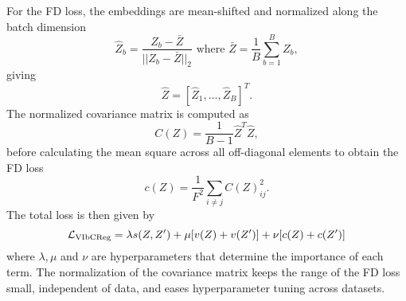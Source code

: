 \documentclass[../../thesis.tex]{subfiles}
\begin{document}
For the FD loss, the embeddings are mean-shifted and normalized along the batch dimension
\begin{equation}
    \widehat{Z}_b = \frac{Z_b-\bar{Z}}{||Z_b-\bar{Z}||_2} \text{ where }  \bar{Z} = \frac{1}{B}\sum_{b=1}^B  Z_b,
\end{equation}
giving 
\begin{equation}
    \widehat{Z} = [\widehat{Z}_1,...,\widehat{Z}_B]^T.
\end{equation}
The normalized covariance matrix is computed as
\begin{equation}
    C(Z) = \frac{1}{B-1}\widehat{Z}^T \widehat{Z},
\end{equation}
before calculating the mean square across all off-diagonal elements to obtain the FD loss
\begin{equation}
    c(Z) = \frac{1}{F^2}\sum_{i\neq j} C(Z)_{ij}^2.
\end{equation}
The total loss is then given by
\begin{equation}
    \label{eq:VIbCRegLoss}
    \mathcal{L}_\text{VIbCReg} = \lambda s(Z,Z') + \mu [v(Z) + v(Z')] + \nu[c(Z)+c(Z')]
\end{equation}
where $\lambda, \mu$ and $\nu$ are hyperparameters that determine the importance of each term. The normalization of the covariance matrix keeps the range of the FD loss small, independent of data, and eases hyperparameter tuning across datasets.

\end{document}
